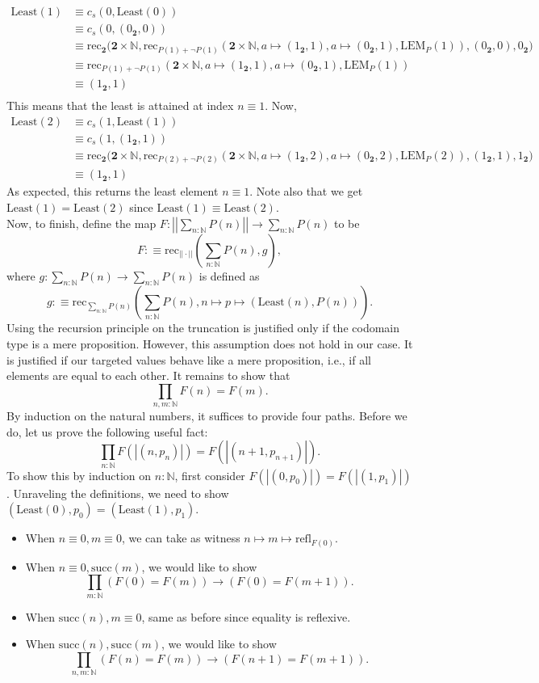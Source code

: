 \documentclass[14pt]{extarticle}
\newcommand{\N}{{\mathbb N}}
\newcommand{\0}{{\mathbf 0}}
\newcommand{\1}{{\mathbf 1}}
\newcommand{\2}{{\mathbf 2}}
\newcommand{\mt}{\mapsto}
\newcommand{\rec}{\mathrm{rec}}
\newcommand{\su}{\mathrm{succ}}
\newcommand{\refl}{\mathrm{refl}}
\newcommand{\LEM}{\mathrm{LEM}}
\begin{document}
\begin{align*}
\text{Least}(1) &\equiv c_s(0,\text{Least}(0)) \\
&\equiv c_s(0,(0_\2,0)) \\
&\equiv \rec_{\2}\Big(\2 \times \N,\rec_{P(1) + \neg P(1)}(\2 \times \N,a \mt (1_\2,1),a \mt (0_\2,1),\LEM_P(1)),(0_\2,0),0_\2\Big) \\
&\equiv \rec_{P(1) + \neg P(1)}(\2 \times \N,a \mt (1_\2,1),a \mt (0_\2,1),\LEM_P(1)) \\
&\equiv (1_\2,1)\\
\end{align*}
This means that the least is attained at index $n \equiv 1$. Now,
\begin{align*}
\text{Least}(2) &\equiv c_s(1,\text{Least}(1)) \\
&\equiv c_s(1,(1_\2,1)) \\
&\equiv \rec_{\2}\Big(\2 \times \N,\rec_{P(2) + \neg P(2)}(\2 \times \N,a \mt (1_\2,2),a \mt (0_\2,2),\LEM_P(2)),(1_\2,1),1_\2\Big) \\
&\equiv (1_\2,1)
\end{align*}
As expected, this returns the least element $n \equiv 1$. Note also that we get $\text{Least}(1) = \text{Least}(2)$ since $\text{Least}(1) \equiv \text{Least}(2)$.\\
Now, to finish, define the map $F : \left|\left|\sum_{n : \N}P(n) \right|\right| \to \sum_{n : \N}P(n)$ to be 
\[F :\equiv \rec_{||\cdot||}(\sum_{n : \N}P(n),g),\] where $g : \sum_{n : \N}P(n) \to \sum_{n : \N}P(n) $ is defined as
\[g : \equiv \rec_{\sum_{n : \N}P(n)}\left(\sum_{n : \N}P(n),n \mt p \mt (\text{Least}(n),P(n))\right).\]
Using the recursion principle on the truncation is justified only if the codomain type is a mere proposition. However, this assumption does not hold in our case. It is justified if our targeted values behave like a mere proposition, i.e., if all elements are equal to each other. It remains to show that
\[\prod_{n,m :\N} F(n) = F(m).\] By induction on the natural numbers, it suffices to provide four paths. Before we do, let us prove the following useful fact:
\[\prod_{n:\N} F(|(n,p_n)|) = F(|(n+1,p_{n+1})|).\] To show this by induction on $n : \N$, first consider $F(|(0,p_0)|) = F(|(1,p_1)|)$. Unraveling the definitions, we need to show $(\text{Least}(0),p_0) = (\text{Least}(1),p_1)$.

\begin{itemize}
\item When $n \equiv 0, m \equiv 0$, we can take as witness $n \mt m \mt \refl_{F(0)}$.
\item When $n \equiv 0, \su(m)$, we would like to show 
\[\prod_{m :\N} \left(F(0) = F(m) \right) \to \left(F(0) = F(m+1)\right).\]
\item When $\su(n), m \equiv 0$, same as before since equality is reflexive.
\item When $\su(n),\su(m)$, we would like to show 
\[\prod_{n,m :\N} \left(F(n) = F(m) \right) \to \left(F(n+1) = F(m+1)\right).\]
\end{itemize}
\end{document}
